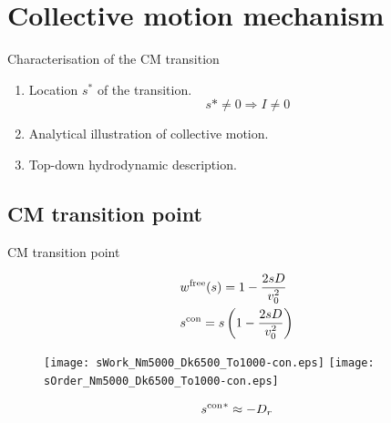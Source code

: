 \documentclass{beamer}
\begin{document}
\section{Collective motion mechanism}

\begin{frame}{Characterisation of the CM transition}

\pause
\begin{enumerate}[<+->]
  \item Location $s^*$ of the transition.
    \begin{equation}
    s* \neq 0 \Rightarrow I \neq 0
    \end{equation}
  \item Analytical illustration of collective motion.
  \item Top-down hydrodynamic description.
\end{enumerate}

\end{frame}

\subsection{CM transition point}

\begin{frame}{CM transition point}


\vspace{-25pt}
\begin{eqnarray}
& w^{\rm free}(s) = 1 - \frac{2 s D}{v_0^2}\\
& s^{\rm con} = s\left(1 - \frac{2 s D}{v_0^2}\right)
\end{eqnarray}

\vspace{-10pt}
\begin{figure}
\centering
\texttt{[image: sWork\_Nm5000\_Dk6500\_To1000-con.eps]}
\texttt{[image: sOrder\_Nm5000\_Dk6500\_To1000-con.eps]}
\end{figure}

\vspace{-25pt}
\begin{equation}
{s^{\rm con}}^* \approx -D_r
\end{equation}


\end{frame}
\end{document}
